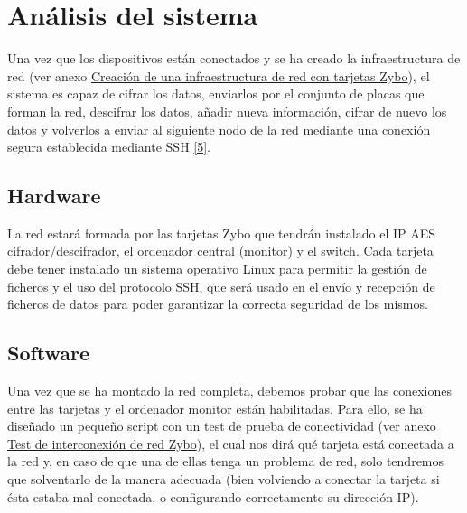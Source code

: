 \section{Análisis del sistema}
Una vez que los dispositivos están conectados y se ha creado la infraestructura de red (ver anexo \hyperlink{CreacionInfraestructura}{Creación de una infraestructura de red con tarjetas Zybo}), el sistema es capaz de cifrar los datos, enviarlos por el conjunto de placas que forman la red, descifrar los datos, añadir nueva información, cifrar de nuevo los datos y volverlos a enviar al siguiente nodo de la red mediante una conexión segura establecida mediante SSH \hyperlink{5}{[5]}.

\subsection{Hardware}
La red estará formada por las tarjetas Zybo que tendrán instalado el IP AES cifrador/descifrador, el ordenador central (monitor) y el switch. Cada tarjeta debe tener instalado un sistema operativo Linux para permitir la gestión de ficheros y el uso del protocolo SSH, que será usado en el envío y recepción de ficheros de datos para poder garantizar la correcta seguridad de los mismos.

\subsection{Software}
Una vez que se ha montado la red completa, debemos probar que las conexiones entre las tarjetas y el ordenador monitor están habilitadas. Para ello, se ha diseñado un pequeño script con un test de prueba de conectividad (ver anexo \hyperlink{TestConexion}{Test de interconexión de red Zybo}), el cual nos dirá qué tarjeta está conectada a la red y, en caso de que una de ellas tenga un problema de red, solo tendremos que solventarlo de la manera adecuada (bien volviendo a conectar la tarjeta si ésta estaba mal conectada, o configurando correctamente su dirección IP).

